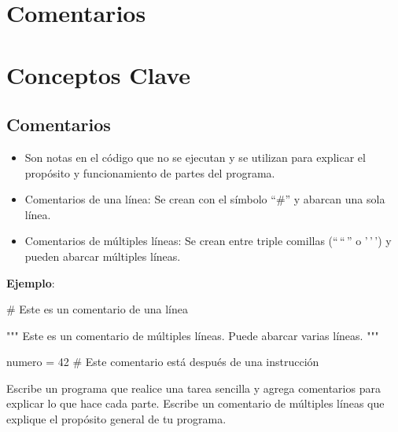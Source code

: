 \documentclass[
  a4paper,
  DIV=11,
  numbers=noendperiod,
  onepage,
  openany]{scrreprt}
\newenvironment{Shaded}{\begin{snugshade}}{\end{snugshade}}
\newcommand{\CommentTok}[1]{\textcolor[rgb]{0.37,0.37,0.37}{#1}}
\newcommand{\DecValTok}[1]{\textcolor[rgb]{0.68,0.00,0.00}{#1}}
\newcommand{\NormalTok}[1]{\textcolor[rgb]{0.00,0.23,0.31}{#1}}
\newcommand{\OperatorTok}[1]{\textcolor[rgb]{0.37,0.37,0.37}{#1}}
\providecommand{\tightlist}{%
  \setlength{\itemsep}{0pt}\setlength{\parskip}{0pt}}\usepackage{longtable,booktabs,array}
\begin{document}
\section{Comentarios}\label{comentarios}

\section{Conceptos Clave}\label{conceptos-clave-3}

\subsection{Comentarios}\label{comentarios-1}

\begin{itemize}
\tightlist
\item
  Son notas en el código que no se ejecutan y se utilizan para explicar
  el propósito y funcionamiento de partes del programa.
\item
  Comentarios de una línea: Se crean con el símbolo ``\#'' y abarcan una
  sola línea.
\item
  Comentarios de múltiples líneas: Se crean entre triple comillas
  (``\,``\,'' o '\,'\,') y pueden abarcar múltiples líneas.
\end{itemize}

\textbf{Ejemplo}:

\begin{Shaded}
\begin{Highlighting}[]
\CommentTok{\# Este es un comentario de una línea}

\CommentTok{"""}
\CommentTok{Este es un comentario}
\CommentTok{de múltiples líneas.}
\CommentTok{Puede abarcar varias líneas.}
\CommentTok{"""}

\NormalTok{numero }\OperatorTok{=} \DecValTok{42}  \CommentTok{\# Este comentario está después de una instrucción}
\end{Highlighting}
\end{Shaded}

\begin{tcolorbox}[enhanced jigsaw, toptitle=1mm, toprule=.15mm, title=\textcolor{quarto-callout-tip-color}{\faLightbulb}\hspace{0.5em}{Actividad Práctica}, colbacktitle=quarto-callout-tip-color!10!white, opacitybacktitle=0.6, titlerule=0mm, colback=white, left=2mm, bottomrule=.15mm, breakable, bottomtitle=1mm, rightrule=.15mm, colframe=quarto-callout-tip-color-frame, arc=.35mm, leftrule=.75mm, coltitle=black, opacityback=0]

Escribe un programa que realice una tarea sencilla y agrega comentarios
para explicar lo que hace cada parte. Escribe un comentario de múltiples
líneas que explique el propósito general de tu programa.

\end{tcolorbox}
\end{document}
